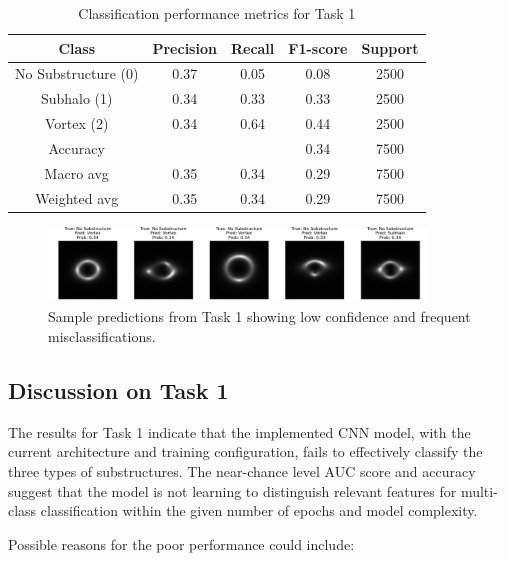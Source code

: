 \documentclass[11pt,a4paper]{article}
\begin{document}
\begin{table}[H]
    \centering
    \caption{Classification performance metrics for Task 1}
    \label{tab:classification_report_multi}
    \begin{tabular}{ccccc}
    \toprule
    \textbf{Class} & \textbf{Precision} & \textbf{Recall} & \textbf{F1-score} & \textbf{Support} \\
    \midrule
    No Substructure (0) & 0.37 & 0.05 & 0.08 & 2500 \\
    Subhalo (1) & 0.34 & 0.33 & 0.33 & 2500 \\
    Vortex (2) & 0.34 & 0.64 & 0.44 & 2500 \\
    \midrule
    Accuracy & & & 0.34 & 7500 \\
    Macro avg & 0.35 & 0.34 & 0.29 & 7500 \\
    Weighted avg & 0.35 & 0.34 & 0.29 & 7500 \\
    \bottomrule
    \end{tabular}
\end{table}

\begin{figure}[H]
    \centering
    \includegraphics[width=0.9\textwidth]{../Task1/results/sample_predictions_multi.png}
    \caption{Sample predictions from Task 1 showing low confidence and frequent misclassifications.}
    \label{fig:sample_predictions_multi}
\end{figure}

\subsection{Discussion on Task 1}
The results for Task 1 indicate that the implemented CNN model, with the current architecture and training configuration, fails to effectively classify the three types of substructures. The near-chance level AUC score and accuracy suggest that the model is not learning to distinguish relevant features for multi-class classification within the given number of epochs and model complexity.

Possible reasons for the poor performance could include:
\end{document}
